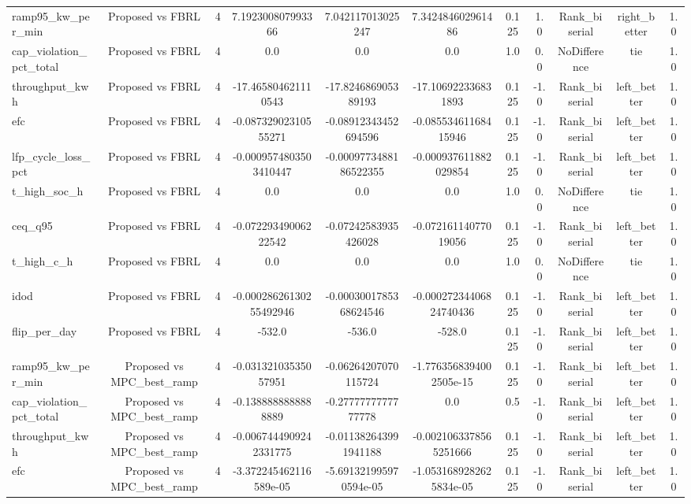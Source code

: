 \begin{table}[t]
\begin{tabular}{lcccccccccc}
ramp95\_kw\_per\_min & Proposed vs FBRL & 4 & 7.192300807993366 & 7.042117013025247 & 7.342484602961486 & 0.125 & 1.0 & Rank\_biserial & right\_better & 1.0 \\
cap\_violation\_pct\_total & Proposed vs FBRL & 4 & 0.0 & 0.0 & 0.0 & 1.0 & 0.0 & NoDifference & tie & 1.0 \\
throughput\_kwh & Proposed vs FBRL & 4 & -17.465804621110543 & -17.824686905389193 & -17.106922336831893 & 0.125 & -1.0 & Rank\_biserial & left\_better & 1.0 \\
efc & Proposed vs FBRL & 4 & -0.08732902310555271 & -0.08912343452694596 & -0.08553461168415946 & 0.125 & -1.0 & Rank\_biserial & left\_better & 1.0 \\
lfp\_cycle\_loss\_pct & Proposed vs FBRL & 4 & -0.0009574803503410447 & -0.0009773488186522355 & -0.000937611882029854 & 0.125 & -1.0 & Rank\_biserial & left\_better & 1.0 \\
t\_high\_soc\_h & Proposed vs FBRL & 4 & 0.0 & 0.0 & 0.0 & 1.0 & 0.0 & NoDifference & tie & 1.0 \\
ceq\_q95 & Proposed vs FBRL & 4 & -0.07229349006222542 & -0.07242583935426028 & -0.07216114077019056 & 0.125 & -1.0 & Rank\_biserial & left\_better & 1.0 \\
t\_high\_c\_h & Proposed vs FBRL & 4 & 0.0 & 0.0 & 0.0 & 1.0 & 0.0 & NoDifference & tie & 1.0 \\
idod & Proposed vs FBRL & 4 & -0.00028626130255492946 & -0.0003001785368624546 & -0.00027234406824740436 & 0.125 & -1.0 & Rank\_biserial & left\_better & 1.0 \\
flip\_per\_day & Proposed vs FBRL & 4 & -532.0 & -536.0 & -528.0 & 0.125 & -1.0 & Rank\_biserial & left\_better & 1.0 \\
ramp95\_kw\_per\_min & Proposed vs MPC\_best\_ramp & 4 & -0.03132103535057951 & -0.06264207070115724 & -1.7763568394002505e-15 & 0.125 & -1.0 & Rank\_biserial & left\_better & 1.0 \\
cap\_violation\_pct\_total & Proposed vs MPC\_best\_ramp & 4 & -0.1388888888888889 & -0.2777777777777778 & 0.0 & 0.5 & -1.0 & Rank\_biserial & left\_better & 1.0 \\
throughput\_kwh & Proposed vs MPC\_best\_ramp & 4 & -0.0067444909242331775 & -0.011382643991941188 & -0.0021063378565251666 & 0.125 & -1.0 & Rank\_biserial & left\_better & 1.0 \\
efc & Proposed vs MPC\_best\_ramp & 4 & -3.372245462116589e-05 & -5.691321995970594e-05 & -1.0531689282625834e-05 & 0.125 & -1.0 & Rank\_biserial & left\_better & 1.0 \\

\end{tabular}
\end{table}

